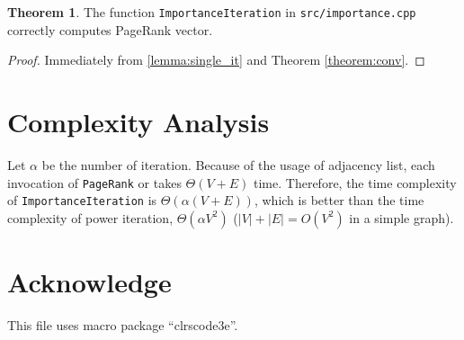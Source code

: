 \documentclass[UTF8]{ctexart}
\theoremstyle{definition}
\newtheorem{theorem}{Theorem}
\begin{document}
\begin{theorem}
    The function \texttt{ImportanceIteration} in \texttt{src/importance.cpp} 
    correctly computes PageRank vector. 
\end{theorem}

\begin{proof}
    Immediately from \ref{lemma:single_it} and Theorem \ref{theorem:conv}. 
\end{proof}

\section*{Complexity Analysis}

Let $\alpha$ be the number of iteration. 
Because of the usage of adjacency list, 
each invocation of \texttt{PageRank} or  takes $\Theta(V + E)$ time. 
Therefore, the time complexity of \texttt{ImportanceIteration} is $\Theta(\alpha (V + E))$, 
which is better than the time complexity of power iteration, $\Theta(\alpha V^2)$ 
($| V | + | E | = O(V^2)$ in a simple graph). 

\section*{Acknowledge}

This file uses macro package ``clrscode3e''. 
\end{document}
